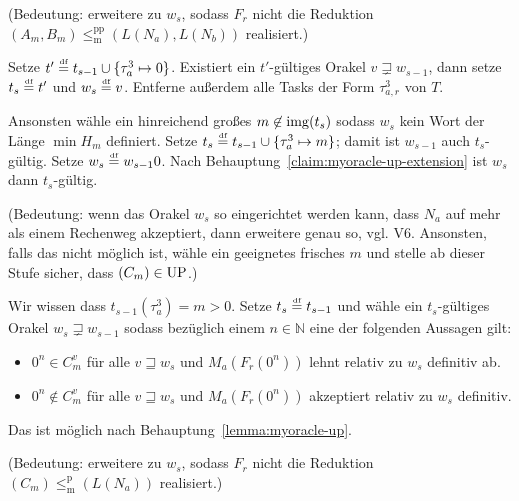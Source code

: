 \begin{description}[leftmargin=\parindent]
        (Bedeutung: erweitere zu $w_s$, sodass $F_r$ nicht die Reduktion $(A_m, B_m)\!\leq_\mathrm{m}^\mathrm{pp}\! (L(N_a), L(N_b))$ realisiert.) 

    \item[Task $\tau^3_{a}$:] Setze $t'\stackrel{\text{\smash{\tiny df}}}{=} t_{s-1}\cup\{\tau^3_{a}\mapsto 0\}$. Existiert ein $t'$-gültiges Orakel $v\sqsupsetneq w_{s-1}$, dann setze $t_s\stackrel{\text{\smash{\tiny df}}}{=} t'$ und $w_s\stackrel{\text{\smash{\tiny df}}}{=} v$. Entferne außerdem alle Tasks der Form $\tau^3_{a,r}$ von $T$.

        Ansonsten wähle ein hinreichend großes $m\not\in \operatorname{img}(t_s)$ sodass $w_s$ kein Wort der Länge $\min H_m$ definiert. Setze $t_s\stackrel{\text{\smash{\tiny df}}}{=} t_{s-1}\cup \{ \tau^3_{a}\mapsto m \}$; damit ist $w_{s-1}$ auch $t_s$-gültig. Setze $w_s\stackrel{\text{\smash{\tiny df}}}{=} w_{s-1}0$. Nach Behauptung~\ref{claim:myoracle-up-extension} ist $w_s$ dann $t_s$-gültig.

        (Bedeutung: wenn das Orakel $w_s$ so eingerichtet werden kann, dass $N_a$ auf mehr als einem Rechenweg akzeptiert, dann erweitere genau so, vgl. V6. Ansonsten, falls das nicht möglich ist, wähle ein geeignetes frisches $m$ und stelle ab dieser Stufe sicher, dass $(C_m)\in \mathrm{UP}$.) 

    \item[Task $\tau^3_{a,r}$:] Wir wissen dass $t_{s-1}(\tau^3_{a})=m>0$. Setze $t_s\stackrel{\text{\smash{\tiny df}}}{=} t_{s-1}$ und wähle ein $t_s$-gültiges Orakel $w_s\sqsupsetneq w_{s-1}$ sodass bezüglich einem $n\in\mathbb N$ eine der folgenden Aussagen gilt:
        \begin{itemize}[nosep,endpenalty=10000]
            \item $0^n\in C_m^v$ für alle $v\sqsupseteq w_s$ und $M_a(F_r(0^n))$ lehnt relativ zu $w_s$ definitiv ab.
            \item $0^n\not\in C_m^v$ für alle $v\sqsupseteq w_s$ und $M_a(F_r(0^n))$ akzeptiert relativ zu $w_s$ definitiv.
        \end{itemize} Das ist möglich nach Behauptung~\ref{lemma:myoracle-up}.

        (Bedeutung: erweitere zu $w_s$, sodass $F_r$ nicht die Reduktion $(C_m)\leq_\mathrm{m}^\mathrm{p} (L(N_a))$ realisiert.) 
\end{description}

